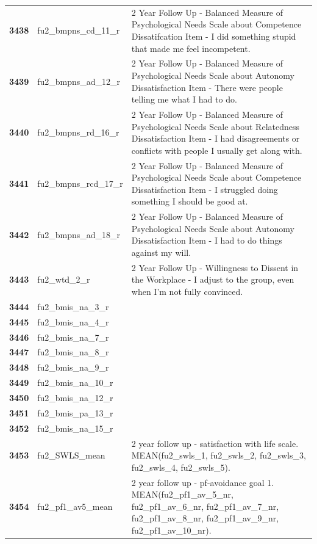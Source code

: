 \documentclass[
  letterpaper,
  DIV=11,
  numbers=noendperiod]{scrartcl}
\begin{document}
\begin{longtable}[t]{>{}cll}
\textbf{3438} & fu2\_bmpns\_cd\_11\_r & 2 Year Follow Up - Balanced Measure of Psychological Needs Scale about Competence Dissatifcation Item - I did something stupid that made me feel incompetent.\\
\textbf{3439} & fu2\_bmpns\_ad\_12\_r & 2 Year Follow Up - Balanced Measure of Psychological Needs Scale about Autonomy Dissatisfaction Item - There were people telling me what I had to do.\\
\textbf{3440} & fu2\_bmpns\_rd\_16\_r & 2 Year Follow Up - Balanced Measure of Psychological Needs Scale about Relatedness Dissatisfaction Item - I had disagreements or conflicts with people I usually get along with.\\
\addlinespace
\textbf{3441} & fu2\_bmpns\_rcd\_17\_r & 2 Year Follow Up - Balanced Measure of Psychological Needs Scale about Competence Dissatisfaction Item - I struggled doing something I should be good at.\\
\textbf{3442} & fu2\_bmpns\_ad\_18\_r & 2 Year Follow Up - Balanced Measure of Psychological Needs Scale about Autonomy Dissatisfaction Item - I had to do things against my will.\\
\textbf{3443} & fu2\_wtd\_2\_r & 2 Year Follow Up - Willingness to Dissent in the Workplace - I adjust to the group, even when I’m not fully convinced.\\
\textbf{3444} & fu2\_bmis\_na\_3\_r & \\
\textbf{3445} & fu2\_bmis\_na\_4\_r & \\
\addlinespace
\textbf{3446} & fu2\_bmis\_na\_7\_r & \\
\textbf{3447} & fu2\_bmis\_na\_8\_r & \\
\textbf{3448} & fu2\_bmis\_na\_9\_r & \\
\textbf{3449} & fu2\_bmis\_na\_10\_r & \\
\textbf{3450} & fu2\_bmis\_na\_12\_r & \\
\addlinespace
\textbf{3451} & fu2\_bmis\_pa\_13\_r & \\
\textbf{3452} & fu2\_bmis\_na\_15\_r & \\
\textbf{3453} & fu2\_SWLS\_mean & 2 year follow up - satisfaction with life scale. MEAN(fu2\_swls\_1, fu2\_swls\_2, fu2\_swls\_3, fu2\_swls\_4, fu2\_swls\_5).\\
\textbf{3454} & fu2\_pf1\_av5\_mean & 2 year follow up - pf-avoidance goal 1. MEAN(fu2\_pf1\_av\_5\_nr, fu2\_pf1\_av\_6\_nr, fu2\_pf1\_av\_7\_nr, fu2\_pf1\_av\_8\_nr, fu2\_pf1\_av\_9\_nr, fu2\_pf1\_av\_10\_nr).\\

\end{longtable}
\end{document}
